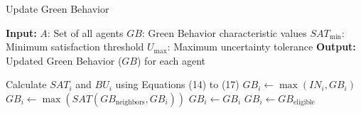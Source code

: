 \begin{algorithm}
\caption{Update Green Behavior}
\begin{algorithmic}[1]
\State \textbf{Input:}
\State $A$: Set of all agents
\State $GB$: Green Behavior characteristic values
\State $SAT_{\text{min}}$: Minimum satisfaction threshold
\State $U_{\text{max}}$: Maximum uncertainty tolerance
\State \textbf{Output:}
\State Updated Green Behavior ($GB$) for each agent

    \State Calculate $SAT_i$ and $BU_i$ using Equations (14) to (17)
                \State $GB_i \gets \max(IN_i, GB_i)$ 
            \Else
                \State $GB_i \gets \max(SAT(GB_{\text{neighbors}}, GB_i))$ 
            \EndIf
        \Else
                \State $GB_i \gets GB_i$ 
            \Else
                \State $GB_i \gets GB_{\text{eligible}}$ 
            \EndIf
        \EndIf
    \EndIf
\EndFor
\EndProcedure
\end{algorithmic}
\end{algorithm}